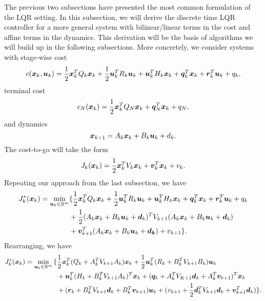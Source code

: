 The previous two subsections have presented the most common formulation of the LQR setting. In this subsection, we will derive the discrete time LQR controller for a more general system with bilinear/linear terms in the cost and affine terms in the dynamics. This derivation will be the basis of algorithms we will build up in the following subsections. More concretely, we consider systems with stage-wise cost
\begin{equation}
    c(\bm{x}_k, \bm{u}_k) = \frac{1}{2} \bm{x}_k^T Q_k \bm{x}_k + \frac{1}{2} \bm{u}_k^T R_k \bm{u}_k + \bm{u}_k^T H_k \bm{x}_k +\bm{q}_k^T \bm{x}_k + \bm{r}^T_k \bm{u}_k + q_k,
\end{equation}
terminal cost
\begin{equation}
    c_N(\bm{x}_k) = \frac{1}{2} \bm{x}_k^T Q_N \bm{x}_k + \bm{q}_N^T \bm{x}_k + q_N,
\end{equation}
and dynamics
\begin{equation}
    \bm{x}_{k+1} = A_k \bm{x}_k + B_k \bm{u}_k + d_k.
\end{equation}
The cost-to-go will take the form 
\begin{equation}
    J_k(\bm{x}_k) = \frac{1}{2}\bm{x}_k^T V_k \bm{x}_k + \bm{v}_k^T \bm{x}_k + v_k.
\end{equation} 
Repeating our approach from the last subsection, we have
\begin{align}
\label{eq:LQR_rec_cost2}
    J_{k}^*(\bm{x}_{k}) =  \min_{\bm{u}_{k} \in \mathbb{R}^m} & {\large\{} 
    \frac{1}{2} \bm{x}_{k}^T Q_{k} \bm{x}_{k} + \frac{1}{2} \bm{u}_{k}^T R_{k} \bm{u}_{k} + \bm{u}_k^T H_k \bm{x}_k +\bm{q}_k^T \bm{x}_k + \bm{r}^T_k \bm{u}_k + q_k \\
    &+ \frac{1}{2} (A_{k} \bm{x}_{k} + B_{k} \bm{u}_{k} + \bm{d}_k)^T V_{k+1} (A_{k} \bm{x}_{k} + B_{k} \bm{u}_{k} + \bm{d}_k) \nonumber \\
    & + \bm{v}^T_{k+1} (A_{k} \bm{x}_{k} + B_{k} \bm{u}_{k} + \bm{d_k}) + v_{k+1} {\large\}}. \nonumber
\end{align}
Rearranging, we have
\begin{align}
    J_{k}^*(\bm{x}_{k}) = \min_{\bm{u}_{k} \in \mathbb{R}^m} {\Large\{}  
    & \frac{1}{2} \bm{x}_k^T (Q_k + A_k^T V_{k+1} A_k) \bm{x}_k + \frac{1}{2} \bm{u}_k^T (R_k + B_k^T V_{k+1} B_k) \bm{u}_k\\
    & + \bm{u}_k^T (H_k + B_k^T V_{k+1} A_k)^T \bm{x}_k + (\bm{q}_k + A_k^T V_{K+1} \bm{d}_k + A_k^T \bm{v}_{k+1})^T \bm{x}_k \nonumber \\
    & + (\bm{r}_k + B_k^T V_{k+1} \bm{d}_k + B_k^T \bm{v}_{k+1}) \bm{u}_k + (v_{k+1} + \frac{1}{2} \bm{d}_k^T V_{k+1} \bm{d}_k + \bm{v}_{k+1}^T \bm{d}_k) \nonumber
    {\Large\}}.
\end{align}
